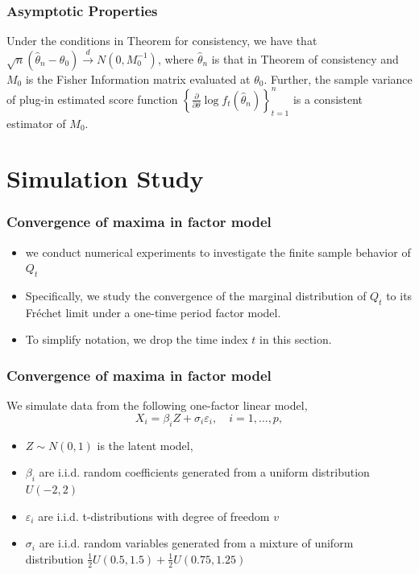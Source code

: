 \documentclass{beamer}
\newcommand{\set}[1]{\left\{#1\right\}}
\begin{document}
\begin{frame}
    \frametitle{Asymptotic Properties}

    \begin{theorem}
        Under the conditions in Theorem for consistency, we have that $\sqrt{n}(\hat{\theta}_n-\theta_0)\stackrel{d}{\to} N(0,M_0^{-1})$, where $\hat{\theta}_n$ is that in Theorem of consistency and $M_0$ is the Fisher Information matrix evaluated at $\theta_0$. Further, the sample variance of plug-in estimated score function $\set{\frac{\partial}{\partial \theta}\log f_t(\hat{\theta}_n)}_{t=1}^n$ is a consistent estimator of $M_0$.
    \end{theorem}

\end{frame}


\section{Simulation Study}

\begin{frame}
    \frametitle{Convergence of maxima in factor model}
\begin{itemize}
    \item we conduct numerical experiments to investigate the finite sample behavior of $Q_t$
    \item Specifically, we study the convergence of the marginal distribution of $Q_t$ to its Fr\'echet limit under a one-time period factor model.
    \item To simplify notation, we drop the time index $t$ in this section.
    \end{itemize}
\end{frame}


\begin{frame}
    \frametitle{Convergence of maxima in factor model}
    We simulate data from the following one-factor
    linear model,
    $$
        X_i=\beta_iZ+\sigma_i\varepsilon_i,\quad i=1,\dots,p,
    $$
    \vspace{-2ex}
\begin{itemize}
    \item $Z\sim N(0,1)$ is the latent model,
    \item $\beta_i$ are i.i.d. random coefficients generated from a uniform distribution $U(-2,2)$
    \item $\varepsilon_i$ are i.i.d.    t-distributions with degree of freedom $v$
    \item $\sigma_i$ are i.i.d. random variables generated from a mixture of
    uniform distribution $\frac{1}{2}U(0.5,1.5)+\frac{1}{2}U(0.75,1.25)$ 
 
\end{itemize}
\end{frame}
\end{document}

